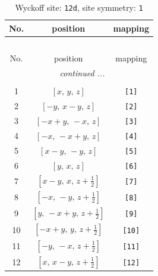 \documentclass[fleqn,8pt]{jsarticle}
\begin{document}
\begin{longtable}{ccc}
\caption{Wyckoff site: {\tt 12d}, site symmetry: {\tt 1}}
 \\
 \hline \hline
No. & position & mapping \\ \hline \endfirsthead

\multicolumn{2}{l}{\tablename\ \thetable{}} \\
 \hline \hline
No. & position & mapping \\ \hline \endhead

 \hline \hline
\multicolumn{2}{r}{\footnotesize\it continued ...} \\ \endfoot

 \hline \hline
\multicolumn{2}{r}{} \\ \endlastfoot

1 & $\left[ x,\, y,\, z \right]$ & {\tt [1]} \\ \hline
2 & $\left[ - y,\, x - y,\, z \right]$ & {\tt [2]} \\ \hline
3 & $\left[ - x + y,\, - x,\, z \right]$ & {\tt [3]} \\ \hline
4 & $\left[ - x,\, - x + y,\, z \right]$ & {\tt [4]} \\ \hline
5 & $\left[ x - y,\, - y,\, z \right]$ & {\tt [5]} \\ \hline
6 & $\left[ y,\, x,\, z \right]$ & {\tt [6]} \\ \hline
7 & $\left[ x - y,\, x,\, z + \frac{1}{2} \right]$ & {\tt [7]} \\ \hline
8 & $\left[ - x,\, - y,\, z + \frac{1}{2} \right]$ & {\tt [8]} \\ \hline
9 & $\left[ y,\, - x + y,\, z + \frac{1}{2} \right]$ & {\tt [9]} \\ \hline
10 & $\left[ - x + y,\, y,\, z + \frac{1}{2} \right]$ & {\tt [10]} \\ \hline
11 & $\left[ - y,\, - x,\, z + \frac{1}{2} \right]$ & {\tt [11]} \\ \hline
12 & $\left[ x,\, x - y,\, z + \frac{1}{2} \right]$ & {\tt [12]} \\
\end{longtable}
\end{document}
